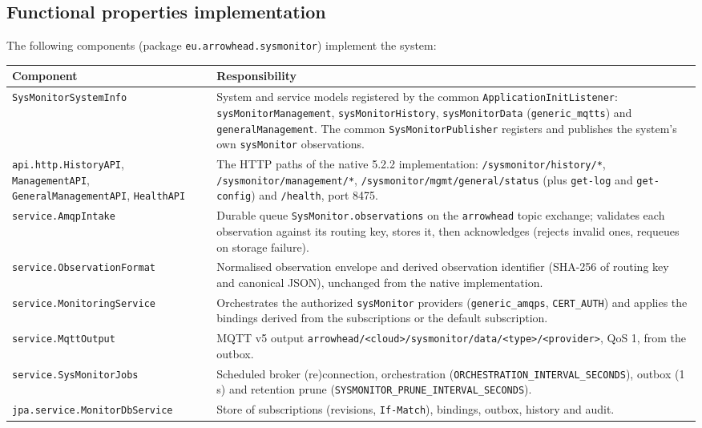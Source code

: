 \documentclass[a4paper]{arrowhead}
\begin{document}
\subsection{Functional properties implementation}

The following components (package \texttt{eu.\allowbreak{}arrowhead.\allowbreak{}sysmonitor}) implement the system:

\noindent\begin{longtable}{| p{5.6cm} | p{9.6cm} |} \hline
\rowcolor{gray!33} Component & Responsibility \\ \hline \endhead
\texttt{SysMonitorSystemInfo} & System and service models registered by the common \texttt{ApplicationInitListener}: \texttt{sysMonitorManagement}, \texttt{sysMonitorHistory}, \texttt{sysMonitorData} (\texttt{generic\_\allowbreak{}mqtts}) and \texttt{generalManagement}. The common \texttt{SysMonitorPublisher} registers and publishes the system's own \texttt{sysMonitor} observations. \\ \hline
\texttt{api.\allowbreak{}http.\allowbreak{}HistoryAPI}, \texttt{ManagementAPI}, \texttt{GeneralManagementAPI}, \texttt{HealthAPI} & The HTTP paths of the native 5.2.2 implementation: \texttt{/sysmonitor/\allowbreak{}history/\allowbreak{}*}, \texttt{/sysmonitor/\allowbreak{}management/\allowbreak{}*}, \texttt{/sysmonitor/\allowbreak{}mgmt/\allowbreak{}general/\allowbreak{}status} (plus \texttt{get-\allowbreak{}log} and \texttt{get-\allowbreak{}config}) and \texttt{/health}, port 8475. \\ \hline
\texttt{service.\allowbreak{}AmqpIntake} & Durable queue \texttt{SysMonitor.\allowbreak{}observations} on the \texttt{arrowhead} topic exchange; validates each observation against its routing key, stores it, then acknowledges (rejects invalid ones, requeues on storage failure). \\ \hline
\texttt{service.\allowbreak{}ObservationFormat} & Normalised observation envelope and derived observation identifier (SHA-256 of routing key and canonical JSON), unchanged from the native implementation. \\ \hline
\texttt{service.\allowbreak{}MonitoringService} & Orchestrates the authorized \texttt{sysMonitor} providers (\texttt{generic\_\allowbreak{}amqps}, \texttt{CERT\_\allowbreak{}AUTH}) and applies the bindings derived from the subscriptions or the default subscription. \\ \hline
\texttt{service.\allowbreak{}MqttOutput} & MQTT v5 output \texttt{arrowhead/\allowbreak{}<cloud>/\allowbreak{}sysmonitor/\allowbreak{}data/\allowbreak{}<type>/\allowbreak{}<provider>}, QoS 1, from the outbox. \\ \hline
\texttt{service.\allowbreak{}SysMonitorJobs} & Scheduled broker (re)connection, orchestration (\texttt{ORCHESTRATION\_\allowbreak{}INTERVAL\_\allowbreak{}SECONDS}), outbox (1 s) and retention prune (\texttt{SYSMONITOR\_\allowbreak{}PRUNE\_\allowbreak{}INTERVAL\_\allowbreak{}SECONDS}). \\ \hline
\texttt{jpa.\allowbreak{}service.\allowbreak{}MonitorDbService} & Store of subscriptions (revisions, \texttt{If-\allowbreak{}Match}), bindings, outbox, history and audit. \\ \hline
\end{longtable}
\end{document}
